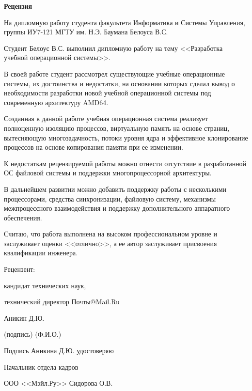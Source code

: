 \documentclass[utf8x, 12pt]{G7-32} %
\begin{document}

\begin{center}
	\textbf{Рецензия}

На дипломную работу студента факультета Информатика и Системы Управления,
группы ИУ7-121 МГТУ им. Н.Э. Баумана Белоуса В.С.
\end{center}

\vskip 1cm

Студент Белоус В.С. выполнил дипломную работу на тему <<Разработка учебной операционной системы>>.

В своей работе студент рассмотрел существующие учебные операционные системы, их достоинства и недостатки,
на основании которых сделал вывод о необходимости разработки новой учебной операционной системы
под современную архитектуру AMD64.

Созданная в данной работе учебная операционная система реализует
полноценную изоляцию процессов, виртуальную память на основе страниц, вытесняющую
многозадачность, потоки уровня ядра и эффективное клонирование процессов на основе
копирования памяти при ее изменении.

К недостаткам рецензируемой работы можно отнести отсутствие в разработанной ОС файловой системы
и поддержки многопроцессорной архитектуры.

В дальнейшем развитии можно добавить поддержку работы с несколькими процессорами,
средства синхронизации, файловую систему, механизмы межпроцессного взаимодействия
и поддержку дополнительного аппаратного обеспечения.

Считаю, что работа выполнена на высоком профессиональном уровне и заслуживает оценки <<отлично>>,
а ее автор заслуживает присвоения квалификации инженера.

\vskip 3cm
\begin{flushright}
Рецензент:

кандидат технических наук,

технический директор Почты@Mail.Ru

\underline{\hskip 5cm} Аникин Д.Ю.

\hskip 1cm (подпись) \hskip 2.8cm (Ф.И.О.)

\vskip 1cm

Подпись Аникина Д.Ю. удостоверяю \underline{\hskip 5cm}

Начальник отдела кадров

ООО <<Мэйл.Ру>> Сидорова О.В.
\end{flushright}
\end{document}
